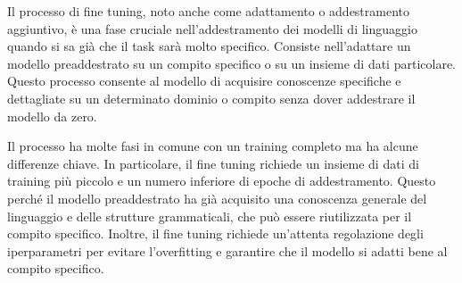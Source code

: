 Il processo di fine tuning, noto anche come adattamento o addestramento aggiuntivo, è una fase cruciale nell'addestramento dei modelli di linguaggio quando si sa già che il task sarà molto specifico. Consiste nell'adattare un modello preaddestrato su un compito specifico o su un insieme di dati particolare. Questo processo consente al modello di acquisire conoscenze specifiche e dettagliate su un determinato dominio o compito senza dover addestrare il modello da zero.

Il processo ha molte fasi in comune con un training completo ma ha alcune differenze chiave. In particolare, il fine tuning richiede un insieme di dati di training più piccolo e un numero inferiore di epoche di addestramento. Questo perché il modello preaddestrato ha già acquisito una conoscenza generale del linguaggio e delle strutture grammaticali, che può essere riutilizzata per il compito specifico. Inoltre, il fine tuning richiede un'attenta regolazione degli iperparametri per evitare l'overfitting e garantire che il modello si adatti bene al compito specifico.


